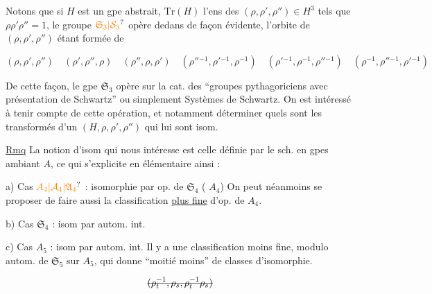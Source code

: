 
Notons que si $H$ est un gpe abstrait, $\mathrm{Tr}(H)$ l'ens des $(\rho,\rho',\rho'')\in H^3$ tels que $\rho\rho'\rho''=1$, le groupe $\unsure{\mathfrak S_3|\mathcal S_3}$ opère dedans de façon évidente, l'orbite de $(\rho,\rho',\rho'')$  étant formée de

\[
(\rho,\rho',\rho'')\quad(\rho',\rho'',\rho)\quad(\rho'',\rho,\rho')\quad
(\rho''{}^{-1},\rho'{}^{-1},\rho^{-1})\quad
(\rho'{}^{-1},\rho^{-1},\rho''{}^{-1})\quad
(\rho^{-1},\rho''{}^{-1},\rho'{}^{-1})
\]

De cette façon, le gpe $\mathfrak S_3$ opère sur la cat. des ``groupes pythagoriciens avec présentation de Schwartz'' ou simplement Systèmes de Schwartz. On est intéressé à tenir compte de cette opération, et notamment déterminer quels sont les transformés  d'un $(H,\rho,\rho',\rho'')$ qui lui sont isom. 

\uline{Rmq} La notion d'isom qui nous intéresse est celle définie par le sch. en gpes ambiant $A$, ce qui s'explicite en  élémentaire ainsi :

a) Cas $\unsure{A_4|\mathcal A_4|\mathfrak A_4}$ : isomorphie par op. de $\mathfrak S_4$  ( $A_4$) On peut néanmoins se proposer de faire aussi la classification \uline{plus fine}  d'op. de $A_4$.

b) Cas $\mathfrak S_4$ : isom par autom. int.

c) Cas $A_5$ : isom par autom. int. Il y a une classification moins fine, modulo autom. de $\mathfrak S_5$ sur $A_5$, qui donne ``moitié moins'' de classes d'isomorphie.





\[
\deleted{(\rho_t^{-1},\rho_s,\rho_t^{-1}\rho_s)}
\]


